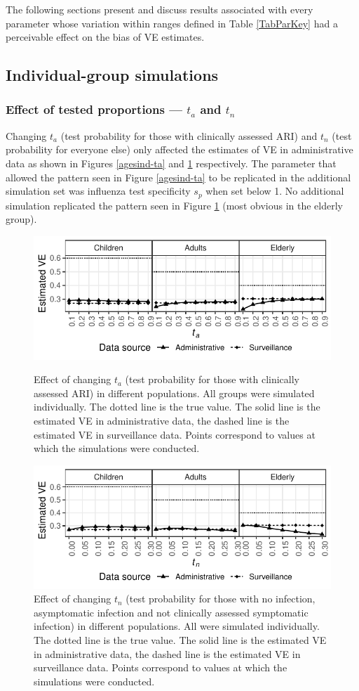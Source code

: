 \documentclass[11pt]{article}
\begin{document}
The following sections present and discuss results associated with every parameter whose variation within ranges defined in Table \ref{TabParKey} had a perceivable effect on the bias of VE estimates.

\subsection{Individual-group simulations}

\subsubsection{Effect of tested proportions --- $t_a$ and $t_n$}

Changing $t_a$ (test probability for those with clinically assessed ARI) and $t_n$ (test probability for everyone else) only affected the estimates of VE in administrative data as shown in Figures \ref{agesind-ta} and \ref{agesind-tn} respectively. The parameter that allowed the pattern seen in Figure \ref{agesind-ta} to be replicated in the additional simulation set was influenza test specificity $s_p$ when set below 1. No additional simulation replicated the pattern seen in Figure \ref{agesind-tn} (most obvious in the elderly group).

\begin{figure}[H]
	\centering
		\includegraphics[width=.75\linewidth]{../fig-agesind/agesind-test_clin.pdf}
		\caption{
Effect of changing $t_a$ (test probability for those with clinically assessed ARI) in different populations. All groups were simulated individually. The dotted line is the true value. The solid line is the estimated VE in administrative data, the dashed line is the estimated VE in surveillance data. Points correspond to values at which the simulations were conducted. \label{agesind-ta}
		}
		\includegraphics[width=.75\linewidth]{../fig-agesind/agesind-test_nonclin.pdf}
		\caption{
Effect of changing $t_n$ (test probability for those with no infection, asymptomatic infection and not clinically assessed symptomatic infection) in different populations. All were simulated individually. The dotted line is the true value. The solid line is the estimated VE in administrative data, the dashed line is the estimated VE in surveillance data. Points correspond to values at which the simulations were conducted. \label{agesind-tn}
		}
\end{figure}
\end{document}
